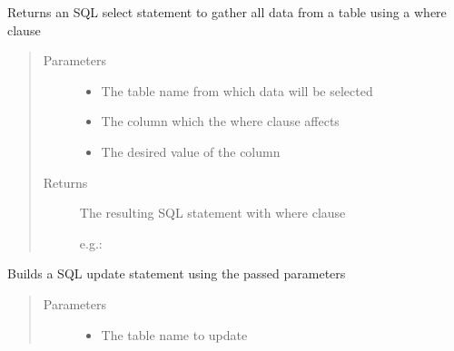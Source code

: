 \documentclass[letterpaper,10pt,english]{sphinxmanual}
\begin{document}
\begin{fulllineitems}

\begin{fulllineitems}
\label{\detokenize{src:src.Database.DatabaseStatements.getSelectAllStatementWhereEquals}}
Returns an SQL select statement to gather all data from a table using a where clause
\begin{quote}\begin{description}
\item[{Parameters}] \leavevmode\begin{itemize}
\item {} 
 \textendash{} The table name from which data will be selected

\item {} 
 \textendash{} The column which the where clause affects

\item {} 
 \textendash{} The desired value of the column

\end{itemize}

\item[{Returns}] \leavevmode

The resulting SQL statement with where clause

e.g.: 


\end{description}\end{quote}

\end{fulllineitems}


\begin{fulllineitems}
\label{\detokenize{src:src.Database.DatabaseStatements.getUpdateByIDStatement}}
Builds a SQL update statement using the passed parameters 
\begin{quote}\begin{description}
\item[{Parameters}] \leavevmode\begin{itemize}
\item {} 
 \textendash{} The table name to update


\end{itemize}
\end{description}
\end{quote}
\end{fulllineitems}
\end{fulllineitems}
\end{document}
